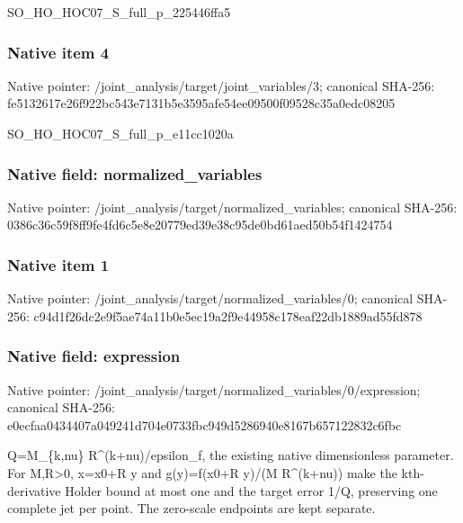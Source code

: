 \documentclass[10pt,a4paper]{article}
\begin{document}
\begingroup\raggedright\sloppy SO\_\allowbreak{}HO\_\allowbreak{}HOC07\_\allowbreak{}S\_\allowbreak{}full\_\allowbreak{}p\_\allowbreak{}225446ffa5\par\endgroup

\subsubsection{Native item 4}
Native pointer: /joint\_\allowbreak{}analysis/target/joint\_\allowbreak{}variables/3; canonical SHA-256: fe5132617e26f922bc543e7131b5e3595afe54ee09500f09528c35a0edc08205

\begingroup\raggedright\sloppy SO\_\allowbreak{}HO\_\allowbreak{}HOC07\_\allowbreak{}S\_\allowbreak{}full\_\allowbreak{}p\_\allowbreak{}e11cc1020a\par\endgroup

\subsubsection{Native field: normalized\_\allowbreak{}variables}
Native pointer: /joint\_\allowbreak{}analysis/target/normalized\_\allowbreak{}variables; canonical SHA-256: 0386c36c59f8ff9fe4fd6c5e8e20779ed39e38c95de0bd61aed50b54f1424754

\subsubsection{Native item 1}
Native pointer: /joint\_\allowbreak{}analysis/target/normalized\_\allowbreak{}variables/0; canonical SHA-256: c94d1f26dc2e9f5ae74a11b0e5ec19a2f9e44958c178eaf22db1889ad55fd878

\subsubsection{Native field: expression}
Native pointer: /joint\_\allowbreak{}analysis/target/normalized\_\allowbreak{}variables/0/expression; canonical SHA-256: e0ecfaa0434407a049241d704e0733fbc949d5286940e8167b657122832c6fbc

\begingroup\raggedright\sloppy Q=\allowbreak{}M\_\allowbreak{}\{k,\allowbreak{}nu\} R\textasciicircum{}(k+nu)/\allowbreak{}epsilon\_\allowbreak{}f,\allowbreak{} the existing native dimensionless parameter. For M,\allowbreak{}R>0,\allowbreak{} x=\allowbreak{}x0+R y and g(y)=\allowbreak{}f(x0+R y)/\allowbreak{}(M R\textasciicircum{}(k+nu)) make the kth-derivative Holder bound at most one and the target error 1/\allowbreak{}Q,\allowbreak{} preserving one complete jet per point. The zero-scale endpoints are kept separate.\par\endgroup
\end{document}
